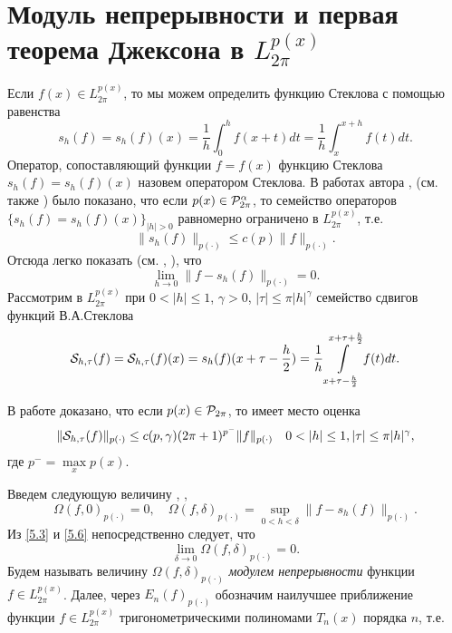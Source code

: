 \section{Модуль непрерывности и первая теорема Джексона в  $L_{2\pi}^{p(x)}$}\label{s5}

Если $f(x)\in L_{2\pi}^{p(x)} $, то мы можем определить функцию Стеклова с помощью равенства
\begin{equation}\label{4.1}
    s_h(f)=s_h(f)(x)=\frac1h\int_0^hf(x+t)dt=\frac1h\int_x^{x+h}f(t)dt.
\end{equation}
Оператор, сопоставляющий функции  $f=f(x)$ функцию Стеклова $s_h(f)=s_h(f)(x)$ назовем оператором Стеклова. В работах автора  \cite{Shar5},
\cite{Shar2} (см. также \cite{Shar3}) было показано, что если $p(x)\in{\cal P}^\alpha_{2\pi}$, то семейство операторов $\{s_h(f)=s_h(f)(x)\}_{|h|>0}$ равномерно ограничено в $ L_{2\pi}^{p(x)} $, т.е.
\begin{equation}\label{5.2}
    \|s_h(f)\|_{p(\cdot)}\le c(p)\|f\|_{p(\cdot)}.
\end{equation}
Отсюда легко показать (см. \cite{Shar5}, \cite{Shar3}), что
\begin{equation}\label{5.3}
    \lim_{h\to0}\|f-s_h(f)\|_{p(\cdot)}=0.
\end{equation}
Рассмотрим в $L^{p(x)}_{2\pi}$ при $0<|h|\le1$, $\gamma>0$, $|\tau|\le\pi |h|^\gamma$ семейство
сдвигов функций  В.А.Стеклова
\begin{equation}\label{5.4}
   {\cal S}_{h,\tau}(f)={\cal
S}_{h,\tau}(f)(x)=s_h(f)(x+\tau-\frac{h}{2})=
\frac{1}{h}\int\limits_{x+\tau-\frac{h}{2}}^{x+\tau+\frac{h}{2}}f(t)dt.
\end{equation}

В работе \cite{Shar2}  доказано, что если $p(x)\in {\cal P}_{2\pi}$, то
имеет место оценка
\begin{equation}\label{5.5}
 \|{\cal S}_{h,\tau}(f)\|_{p(\cdot)}\le
c(p,\gamma)(2\pi+1)^{p^-}\|f\|_{p(\cdot)} \quad 0<|h|\le1, |\tau|\le\pi
|h|^\gamma,
\end{equation}
где $p^-=\max\limits_{x}p(x)$.

Введем следующую величину \cite{Shar2}, \cite{Shar3}, \cite{Shar6}
\begin{equation}\label{5.6}
    \Omega(f,0)_{p(\cdot)}=0,\quad \Omega(f,\delta)_{p(\cdot)}=\sup_{0<h<\delta}\|f-s_h(f)\|_{p(\cdot)}.
\end{equation}
Из \eqref{5.3} и \eqref{5.6} непосредственно следует, что
\begin{equation}\label{5.7}
    \lim_{\delta\to0}\Omega(f,\delta)_{p(\cdot)}=0.
\end{equation}
Будем называть величину $\Omega(f,\delta)_{p(\cdot)}$ {\it модулем непрерывности} функции $f\in L_{2\pi}^{p(x)} $.
Далее, через $E_n(f)_{p(\cdot)}$  обозначим наилучшее приближение функции $f\in L_{2\pi}^{p(x)} $ тригонометрическими полиномами $T_n(x)$ порядка $n$, т.е.

